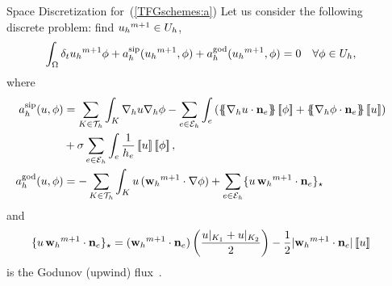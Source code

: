\documentclass[final]{beamer}
\newlength{\sepwid}
\newlength{\onecolwid}
\begin{document}
\begin{frame}[t]
\begin{columns}[t]
\begin{column}{\onecolwid}
\begin{block}{Space Discretization for~(\ref{TFGschemes:a})}
        Let us consider the following discrete problem: find
        ${{u_{h}}^{m+1}}\in U_h$,
        \begin{equation}
        \label{discrete_problem_u}
          \int_\Omega \delta_t{{u_{h}}^{m+1}} \phi + a_h^{\mathrm{sip}}({{u_{h}}^{m+1}},\phi) + a_h^{\mathrm{god}}({{u_{h}}^{m+1}},\phi)=0 \quad \forall\phi\in U_h,
        \end{equation}
        where
        \begin{align*}
          \asip(u,\phi) &= \sum_{K\in\mathcal{T}_h}\int_K\nabla_h u\nabla_h \phi-\sum_{e\in\mathcal{E}_h}\int_e\left(\average{\nabla_h u\cdot\mathbf{n}_e}\jump{\phi}+\average{\nabla_h \phi\cdot\mathbf{n}_e}\jump{u}\right)\\&+\sigma\sum_{e\in\mathcal{E}_h}\int_e\frac{1}{h_e}\jump{u}\jump{\phi},
          \\
          \agod(u,\phi) &= -\sum_{K \in\mathcal{T}_h} \int_K u \, (\wwmm\cdot \grad\phi)
                            + \sum_{e\in\Eh}\{ u \, \wwmm \cdot \nn_e\}_\star
        \end{align*}
        and
        $$
        \{ u \, {{\mathbf{w}_{h}}^{m+1}} \cdot \mathbf{n}_e\}_\star=({{\mathbf{w}_{h}}^{m+1}}\cdot \mathbf{n}_e)\left(\frac{u|_{K_1}+u|_{K_2}}{2}\right)-\frac{1}{2}|{{\mathbf{w}_{h}}^{m+1}}\cdot\mathbf{n}_e|\left[\!\left[u\right]\!\right]
        $$
        is the Godunov (upwind) flux~\cite{anderson_high-order_2017}.

      \end{block}

    \end{column}



    \begin{column}{\sepwid}  \end{column}

    \vspace*{0.5cm}


\end{columns}
\end{frame}
\end{document}
